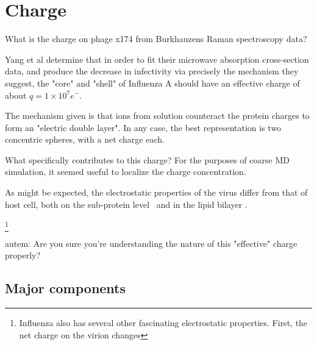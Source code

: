 \documentclass[paper.tex]{subfiles}
\begin{document}
\section{Charge}


\begin{autem}
	What is the charge on phage x174 from Burkhauzens Raman spectroscopy data?
\end{autem}

Yang et al determine that in order to fit their microwave absorption cross-section data, and produce the decrease in infectivity via precisely the mechanism they suggest, the "core" and "shell" of Influenza A should have an effective charge of about $q=1 \times 10^7 e^-$. 

The mechanism given is that ions from solution counteract the protein charges to form an "electric double layer". In any case, the best representation is two concentric spheres, with a net charge each.

What specifically contributes to this charge? For the purposes of coarse MD simulation, it seemed useful to localize the charge concentration. 

As might be expected, the electrostatic properties of the virus differ from that of host cell, both on the sub-protein level\cite{Icosahedral2019} \footnotemark \ and in the lipid bilayer \cite{Lipid2015} \footnotemark. 



\footnote{Influenza also has several other fascinating electrostatic properties. First, the net charge on the virion changes}

\begin{autem}
	autem: Are you sure you're understanding the nature of this "effective" charge properly?
\end{autem}

\subsection{Major components}
\end{document}
